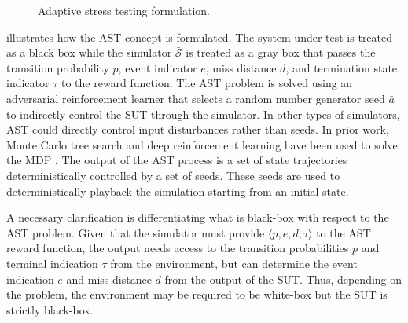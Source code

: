 \begin{figure}[!ht]
\centering
\resizebox{0.85\columnwidth}{!}{}
\caption{Adaptive stress testing formulation.}
\label{fig:ast_mdp}
\end{figure}

 illustrates how the AST concept is formulated.
The system under test is treated as a black box while the simulator $\mathcal{\bar{S}}$ is treated as a gray box that passes the transition probability $p$, event indicator $e$, miss distance $d$, and termination state indicator $\tau$ to the reward function.
The AST problem is solved using an adversarial reinforcement learner that selects a random number generator seed $\bar{a}$ to indirectly control the SUT through the simulator.
In other types of simulators, AST could directly control input disturbances rather than seeds.
In prior work, Monte Carlo tree search and deep reinforcement learning have been used to solve the MDP \cite{lee2015adaptive, koren2018adaptive}.
The output of the AST process is a set of state trajectories deterministically controlled by a set of seeds. 
These seeds are used to deterministically playback the simulation starting from an initial state.

A necessary clarification is differentiating what is black-box with respect to the AST problem.
Given that the simulator must provide $\langle p, e, d, \tau \rangle$ to the AST reward function, the output needs access to the transition probabilities $p$ and terminal indication $\tau$ from the environment, but can determine the event indication $e$ and miss distance $d$ from the output of the SUT.
Thus, depending on the problem, the environment may be required to be white-box but the SUT is strictly black-box.




